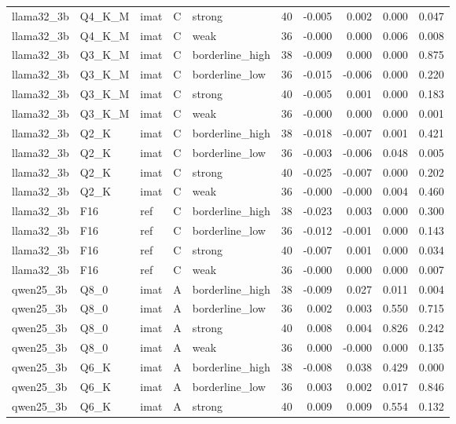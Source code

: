 \begin{tabular}{lllllrrrrr}
llama32\_3b & Q4\_K\_M & imat & C & strong & 40 & -0.005 & 0.002 & 0.000 & 0.047 \\
llama32\_3b & Q4\_K\_M & imat & C & weak & 36 & -0.000 & 0.000 & 0.006 & 0.008 \\
llama32\_3b & Q3\_K\_M & imat & C & borderline\_high & 38 & -0.009 & 0.000 & 0.000 & 0.875 \\
llama32\_3b & Q3\_K\_M & imat & C & borderline\_low & 36 & -0.015 & -0.006 & 0.000 & 0.220 \\
llama32\_3b & Q3\_K\_M & imat & C & strong & 40 & -0.005 & 0.001 & 0.000 & 0.183 \\
llama32\_3b & Q3\_K\_M & imat & C & weak & 36 & -0.000 & 0.000 & 0.000 & 0.001 \\
llama32\_3b & Q2\_K & imat & C & borderline\_high & 38 & -0.018 & -0.007 & 0.001 & 0.421 \\
llama32\_3b & Q2\_K & imat & C & borderline\_low & 36 & -0.003 & -0.006 & 0.048 & 0.005 \\
llama32\_3b & Q2\_K & imat & C & strong & 40 & -0.025 & -0.007 & 0.000 & 0.202 \\
llama32\_3b & Q2\_K & imat & C & weak & 36 & -0.000 & -0.000 & 0.004 & 0.460 \\
llama32\_3b & F16 & ref & C & borderline\_high & 38 & -0.023 & 0.003 & 0.000 & 0.300 \\
llama32\_3b & F16 & ref & C & borderline\_low & 36 & -0.012 & -0.001 & 0.000 & 0.143 \\
llama32\_3b & F16 & ref & C & strong & 40 & -0.007 & 0.001 & 0.000 & 0.034 \\
llama32\_3b & F16 & ref & C & weak & 36 & -0.000 & 0.000 & 0.000 & 0.007 \\
qwen25\_3b & Q8\_0 & imat & A & borderline\_high & 38 & -0.009 & 0.027 & 0.011 & 0.004 \\
qwen25\_3b & Q8\_0 & imat & A & borderline\_low & 36 & 0.002 & 0.003 & 0.550 & 0.715 \\
qwen25\_3b & Q8\_0 & imat & A & strong & 40 & 0.008 & 0.004 & 0.826 & 0.242 \\
qwen25\_3b & Q8\_0 & imat & A & weak & 36 & 0.000 & -0.000 & 0.000 & 0.135 \\
qwen25\_3b & Q6\_K & imat & A & borderline\_high & 38 & -0.008 & 0.038 & 0.429 & 0.000 \\
qwen25\_3b & Q6\_K & imat & A & borderline\_low & 36 & 0.003 & 0.002 & 0.017 & 0.846 \\
qwen25\_3b & Q6\_K & imat & A & strong & 40 & 0.009 & 0.009 & 0.554 & 0.132 \\

\end{tabular}
